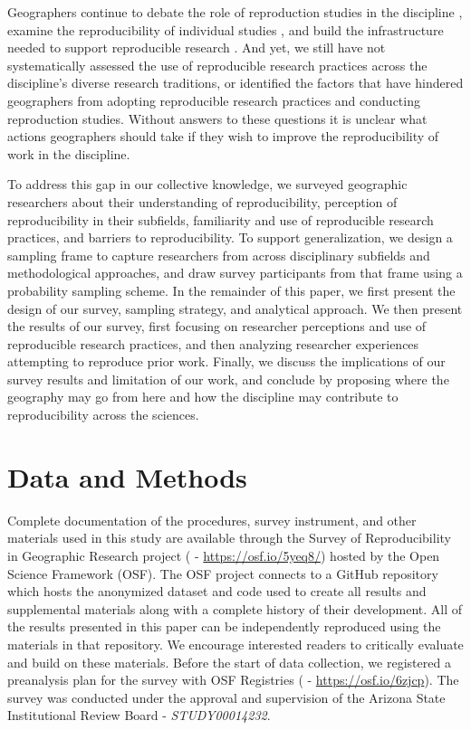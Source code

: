 \documentclass[]{interact}
\newcommand{\citep}{\parencite}
\theoremstyle{plain}%
\theoremstyle{definition}
\theoremstyle{remark}
\begin{document}
Geographers continue to debate the role of reproduction studies in the discipline \citep{brunsdon2016, goodchild2021Annals, kedron2022replication, kedron2021IJGIS, singleton2016, sui2021, Wainwright2021}, examine the reproducibility of individual studies \citep{Nust_AGILE_2022, ostermann2021}, and build the infrastructure needed to support reproducible research \citep{nust2019, wilson2021, yin2019cybergis, Kedron_Holler_Bardin_Hilgendorf_2022}. 
And yet, we still have not systematically assessed the use of reproducible research practices across the discipline's diverse research traditions, or identified the factors that have hindered geographers from adopting reproducible research practices and conducting reproduction studies. 
Without answers to these questions it is unclear what actions geographers should take if they wish to improve the reproducibility of work in the discipline.

To address this gap in our collective knowledge, we surveyed geographic researchers about their understanding of reproducibility, perception of reproducibility in their subfields, familiarity and use of reproducible research practices, and barriers to reproducibility.
To support generalization, we design a sampling frame to capture researchers from across disciplinary subfields and methodological approaches, and draw survey participants from that frame using a probability sampling scheme.
In the remainder of this paper, we first present the design of our survey, sampling strategy, and analytical approach. 
We then present the results of our survey, first focusing on researcher perceptions and use of reproducible research practices, and then analyzing researcher experiences attempting to reproduce prior work. 
Finally, we discuss the implications of our survey results and limitation of our work, and conclude by proposing where the geography may go from here and how the discipline may contribute to reproducibility across the sciences. 


\section*{Data and Methods}
Complete documentation of the procedures, survey instrument, and other materials used in this study are available through the Survey of Reproducibility in Geographic Research project (\textcite{Kedron_Holler_Bardin_Hilgendorf_2022} - \url{https://osf.io/5yeq8/}) hosted by the Open Science Framework (OSF).
The OSF project connects to a GitHub repository which hosts the anonymized dataset and code used to create all results and supplemental materials along with a complete history of their development. 
All of the results presented in this paper can be independently reproduced using the materials in that repository.
We encourage interested readers to critically evaluate and build on these materials.
Before the start of data collection, we registered a preanalysis plan for the survey with OSF Registries (\textcite{Kedron_Survey_PAP} - \url{https://osf.io/6zjcp}). 
The survey was conducted under the approval and supervision of the Arizona State Institutional Review Board - \textit{STUDY00014232}.
\end{document}
